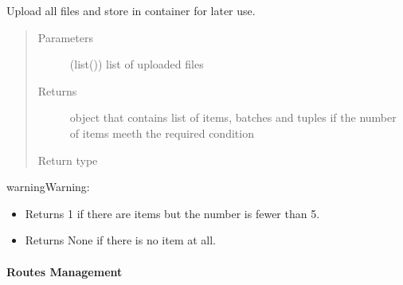 \documentclass[a4paper,12pt,english]{sphinxmanual}
\begin{document}
\begin{fulllineitems}
\label{\detokenize{project_rst/user_rst/helpers:project.user.helpers.upload_file}}
Upload all files and store in container for later use.
\begin{quote}\begin{description}
\item[{Parameters}] \leavevmode
{} (list()) \textendash{} list of uploaded files

\item[{Returns}] \leavevmode
object that contains list of items, batches and tuples
if the number of items meeth the required condition

\item[{Return type}] \leavevmode
{\hyperref[\detokenize{project_rst/generator:project.generator.DataGenerator}]{}}

\end{description}\end{quote}

\begin{sphinxadmonition}{warning}{Warning:}\begin{itemize}
\item {} 
Returns 1 if there are items but the number is fewer than 5.

\item {} 
Returns None if there is no item at all.

\end{itemize}
\end{sphinxadmonition}

\end{fulllineitems}



\paragraph{Routes Management}
\label{\detokenize{project_rst/user_rst/routes:module-project.user.account}}\label{\detokenize{project_rst/user_rst/routes:routes-management}}\label{\detokenize{project_rst/user_rst/routes::doc}}
\end{document}
